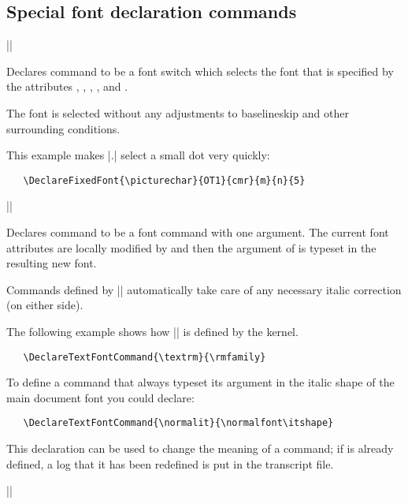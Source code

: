 \documentclass{ltxguide}[1995/11/28]
\begin{document}
 
\subsection{Special font declaration commands}
 
\begin{decl}
|\DeclareFixedFont|    
                     
\end{decl}
 
Declares command  to be a font switch which selects the font
that is specified by the attributes , ,
, , and .
 
The font is selected without any adjustments to baselineskip and other
surrounding conditions.
 
This example makes |{\picturechar .}| select a small dot very quickly:
\begin{verbatim}
   \DeclareFixedFont{\picturechar}{OT1}{cmr}{m}{n}{5}
\end{verbatim}
 
 
\begin{decl}
|\DeclareTextFontCommand|  
\end{decl}
 
Declares command  to be a font command with one argument.
The current font attributes are locally modified by 
and then the argument of  is typeset in the resulting new font.
 
Commands defined by |\DeclareTextFontCommand| automatically take care
of any necessary italic correction (on either side).
 
The following example shows how |\textrm| is defined by the kernel.
\begin{verbatim}
   \DeclareTextFontCommand{\textrm}{\rmfamily}
\end{verbatim}
 
To define a command that always typeset its argument in the italic
shape of the main document font you could declare:
\begin{verbatim}
   \DeclareTextFontCommand{\normalit}{\normalfont\itshape}
\end{verbatim}
 
This declaration can be used to change the meaning of a command; if
 is already defined, a log that it has been redefined
is put in the transcript file.
 
\begin{decl}
|\DeclareOldFontCommand|  
\end{decl}
 
\end{document}
